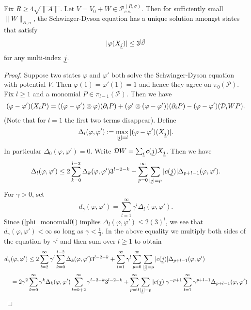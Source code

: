 \begin{thm}\label{Gibbs_state_unique}
Fix $R\geq 4\sqrt{\|A\|}$. Let $V=V_0+W\in \mathscr{P}_{c.s.}^{(R,\sigma)}$. Then for sufficiently small $\|W\|_{R,\sigma}$, the Schwinger-Dyson equation has a unique solution amongst states that satisfy
	\begin{align}\label{phi_monomial0}
		|\varphi(X_{\underline{j}})| \leq 3^{|\underline{j}|}
	\end{align}
for any multi-index $\underline{j}$.
\end{thm}
\begin{proof}
Suppose two states $\varphi$ and $\varphi'$ both solve the Schwinger-Dyson equation with potential $V$. Then $\varphi(1)=\varphi'(1)=1$ and hence they agree on $\pi_0(\mathscr{P})$. Fix $l\geq 1$ and a monomial $P\in \pi_{l-1}(\mathscr{P})$. Then we have
	\begin{align*}
		(\varphi-\varphi')(X_i P)= ((\varphi-\varphi')\otimes\varphi)(\partial_i P) + (\varphi'\otimes (\varphi-\varphi'))(\partial_i P) - (\varphi-\varphi')(\mathcal D_i W P).
	\end{align*}
(Note that for $l=1$ the first two terms disappear). Define
	\begin{equation*}
		\Delta_l(\varphi,\varphi'):=\max_{|\underline{j}|=l} |(\varphi-\varphi')(X_{\underline{j}})|.
	\end{equation*}
In particular $\Delta_0(\varphi,\varphi')=0$. Write $\mathcal D W=\sum_{\underline{i}} c(\underline{j}) X_{\underline{j}}$. Then we have
	\begin{align*}
		\Delta_l(\varphi,\varphi') \leq 2 \sum_{k=0}^{l-2} \Delta_k(\varphi,\varphi') 3^{l-2-k} + \sum_{p=0}^\infty \sum_{|\underline{j}|=p} |c(\underline{j})| \Delta_{p+l-1}(\varphi,\varphi').
	\end{align*}
For $\gamma>0$, set
	\begin{equation*}
		d_\gamma(\varphi,\varphi') = \sum_{l=1}^\infty \gamma^l \Delta_l(\varphi,\varphi').
	\end{equation*}
Since (\ref{phi_monomial0}) implies $\Delta_l(\varphi,\varphi')\leq 2 (3)^l$, we see that $d_\gamma(\varphi,\varphi')<\infty$ so long as $\gamma< \frac{1}{3}$. In the above equality we multiply both sides of the equation by $\gamma^l$ and then sum over $l\geq 1$ to obtain
	\begin{align*}
		d_\gamma&(\varphi,\varphi') \leq 2\sum_{l=2}^\infty \gamma^l\sum_{k=0}^{l-2} \Delta_k(\varphi,\varphi') 3^{l-2-k} + \sum_{l=1}^\infty \gamma^l \sum_{p=0}^\infty \sum_{|\ul{j}|=p} |c(\ul{j})| \Delta_{p+l-1}(\varphi,\varphi')\\
				&=2\gamma^2\sum_{k=0}^\infty \gamma^k\Delta_k(\varphi,\varphi')\sum_{l=k+2}^\infty \gamma^{l-2-k}3^{l-2-k} + \sum_{p=0}^\infty \sum_{|\ul{j}|=p} |c(\ul{j})| \gamma^{-p+1}\sum_{l=1}^\infty \gamma^{p+l-1}\Delta_{p+l-1}(\varphi,\varphi')\\

\end{align*}
\end{proof}
